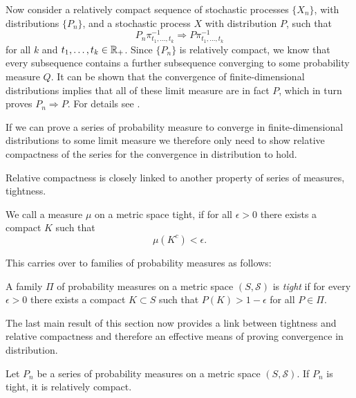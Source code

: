 Now consider a relatively compact sequence of stochastic processes $\{X_n\}$,
with distributions $\{P_n\}$,
and a stochastic process $X$ with distribution $P$,
such that
\begin{equation}
	P_n\pi^{-1}_{t_1, \dots, t_k} \Rightarrow P\pi^{-1}_{t_1, \dots, t_k}
\end{equation}
for all $k$ and $t_1, \dots, t_k \in \mathbb{R}_+$.
Since $\{P_n\}$ is relatively compact,
we know that every subsequence contains a further subsequence converging to some probability measure $Q$.
It can be shown that the convergence of finite-dimensional distributions implies that all of these
limit measure are in fact $P$,
which in turn proves $P_n \Rightarrow P$. For details see \cite[p.57]{Billingsley.1999}.

If we can prove a series of probability measure to converge in finite-dimensional distributions to some
limit measure we therefore only need to show relative compactness of the series
for the convergence in distribution to hold.

Relative compactness is closely linked to another property of series of measures, tightness.

We call a measure $\mu$ on a metric space tight,
if for all $\epsilon > 0$ there exists a compact $K$ such that
\begin{equation}
	\mu(K^c) < \epsilon.
\end{equation}

This carries over to families of probability measures as follows:

\begin{definition} \label{D: tightness}
	A family $\Pi$ of probability measures on a metric space $(S, \mathcal{S})$ is \emph{tight} 
	if for every $\epsilon > 0$ there exists a compact $K \subset S$
	such that $P(K) > 1 - \epsilon$
	for all $P \in \Pi$.	
\end{definition}

The last main result of this section now provides a link between tightness and relative compactness
and therefore an effective means of proving convergence in distribution.

\begin{theorem} \label{T: Prohorov}
	Let $P_n$ be a series of probability measures on a metric space $(S, \mathcal{S})$. 
	If $P_n$ is tight, it is relatively compact.
\end{theorem}

